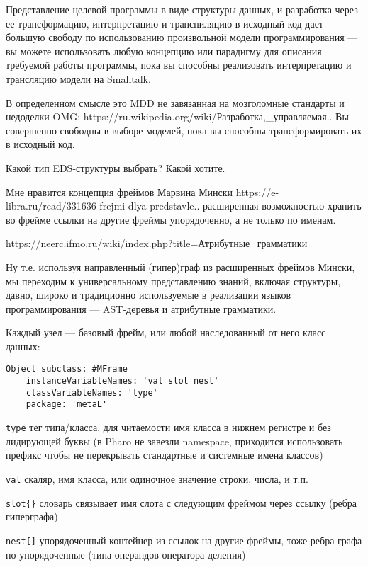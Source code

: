 Представление целевой программы в виде структуры данных, и разработка через ее трансформацию, интерпретацию и транспиляцию в исходный код дает большую свободу по использованию произвольной модели программирования — вы можете использовать любую концепцию или парадигму для описания требуемой работы программы, пока вы способны реализовать интерпретацию и трансляцию модели на Smalltalk.

В определенном смысле это MDD не завязанная на мозголомные стандарты и недоделки OMG: https://ru.wikipedia.org/wiki/Разработка,_управляемая..
Вы совершенно свободны в выборе моделей, пока вы способны трансформировать их в исходный код.

\clearpage

Какой тип EDS-структуры выбрать? Какой хотите.

Мне нравится концепция фреймов Марвина Мински https://e-libra.ru/read/331636-frejmi-dlya-predstavle.. расширенная возможностью хранить во фрейме ссылки на другие фреймы упорядоченно, а не только по именам.

\url{https://neerc.ifmo.ru/wiki/index.php?title=Атрибутные_грамматики}

Ну т.е. используя направленный (гипер)граф из расширенных фреймов Мински, мы переходим к универсальному представлению знаний, включая структуры, давно, широко и традиционно используемые в реализации языков программирования — AST-деревья и атрибутные грамматики.

Каждый узел — базовый фрейм, или любой наследованный от него класс данных:

\begin{verbatim}
Object subclass: #MFrame
    instanceVariableNames: 'val slot nest'
    classVariableNames: 'type'
    package: 'metaL'
\end{verbatim}

\verb|type| тег типа/класса, для читаемости имя класса в нижнем регистре и без лидирующей буквы (в Pharo не завезли namespace, приходится использовать префикс чтобы не перекрывать стандартные и системные имена классов)

\verb|val| скаляр, имя класса, или одиночное значение строки, числа, и т.п.

\verb|slot{}| словарь связывает имя слота с следующим фреймом через ссылку (ребра гиперграфа)

\verb|nest[]| упорядоченный контейнер из ссылок на другие фреймы, тоже ребра графа но упорядоченные (типа операндов оператора деления)


